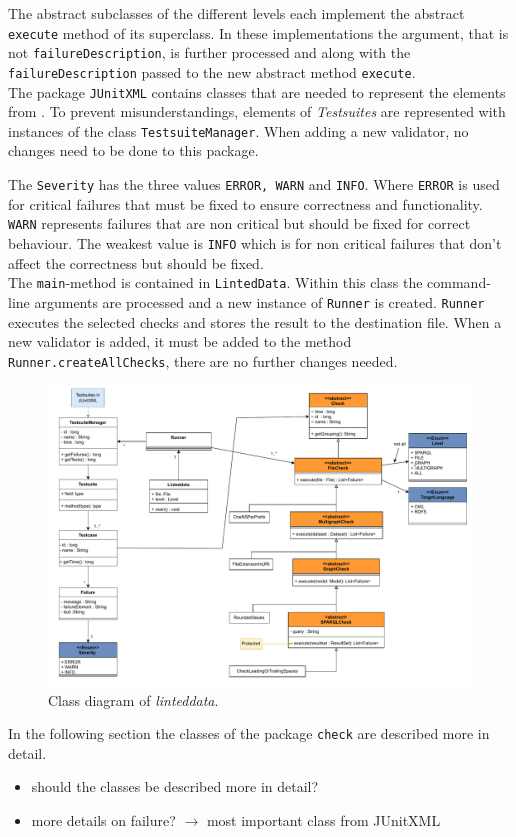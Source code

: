 \documentclass[11pt,a4paper]{article}
\newcommand{\function}[1]{\texttt{#1}}
\newcommand{\argument}[1]{\texttt{#1}}
\newcommand{\class}[1]{\texttt{#1}}
\newcommand{\enum}[1]{\texttt{#1}}
\newcommand{\package}[1]{\texttt{#1}}
\newcommand{\toolname}{\textit{linteddata}}
\begin{document}
The abstract subclasses of the different levels each implement the abstract \texttt{execute} method of its superclass. 
In these implementations the argument, that is not \argument{failureDescription}, is further processed and along with the \argument{failureDescription} passed to the new abstract method \function{execute}.
\\
The package \package{JUnitXML} contains classes that are needed to represent the elements from \cite{JUnitXML_ibm}. 
To prevent misunderstandings, elements of \textit{Testsuites} are represented with instances of the class \class{TestsuiteManager}. 
When adding a new validator, no changes need to be done to this package. 

The \enum{Severity} has the three values \enum{ERROR, WARN} and \enum{INFO}. 
Where \enum{ERROR} is used for critical failures that must be fixed to ensure correctness and functionality. 
\enum{WARN} represents failures that are non critical but should be fixed for correct behaviour. 
The weakest value is \enum{INFO} which is for non critical failures that don't affect the correctness but should be fixed.   
\\
The \function{main}-method is contained in \class{LintedData}. 
Within this class the command-line arguments are processed and a new instance of \class{Runner} is created. 
\class{Runner} executes the selected checks and stores the result to the destination file. 
When a new validator is added, it must be added to the method \function{Runner.createAllChecks}, there are no further changes needed. 
%
\begin{landscape}
\begin{figure}[tb]
	\centering
	\includegraphics[width=\textwidth]{../graphics/class_diagram.pdf}
	\caption{Class diagram of \toolname .}
	\label{fig:general_architecture:class_diagram}
\end{figure}
\end{landscape}
%
In the following section the classes of the package \package{check} are described more in detail. 
\begin{itemize}
	\item should the classes be described more in detail?
	\item more details on failure? $\rightarrow$ most important class from JUnitXML
\end{itemize}
%
\end{document}
